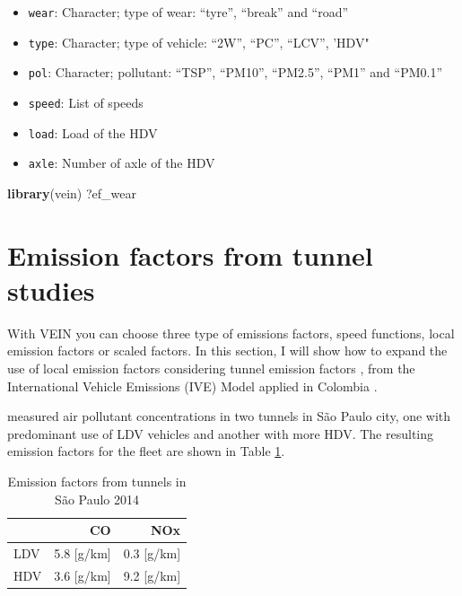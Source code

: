 \documentclass[12pt,graybox,envcountchap,sectrefs]{krantz}
\makeatletter
\newenvironment{Shaded}{\begin{snugshade}}{\end{snugshade}}
\newcommand{\KeywordTok}[1]{\textcolor[rgb]{0.13,0.29,0.53}{\textbf{#1}}}
\newcommand{\NormalTok}[1]{#1}
\providecommand{\tightlist}{%
  \setlength{\itemsep}{0pt}\setlength{\parskip}{0pt}}
\newenvironment{kframe}{%
\medskip{}
\setlength{\fboxsep}{.8em}
 \def\at@end@of@kframe{}%
 \ifinner\ifhmode%
  \def\at@end@of@kframe{\end{minipage}}%
  \begin{minipage}{\columnwidth}%
 \fi\fi%
 \def\FrameCommand##1{\hskip\@totalleftmargin \hskip-\fboxsep
 \colorbox{shadecolor}{##1}\hskip-\fboxsep
     \hskip-\linewidth \hskip-\@totalleftmargin \hskip\columnwidth}%
 \MakeFramed {\advance\hsize-\width
   \@totalleftmargin\z@ \linewidth\hsize
   \@setminipage}}%
 {\par\unskip\endMakeFramed%
 \at@end@of@kframe}
\renewenvironment{Shaded}{\begin{kframe}}{\end{kframe}}
\theoremstyle{definition}
\theoremstyle{definition}
\theoremstyle{definition}
\theoremstyle{remark}
\makeatother
\begin{document}
\begin{itemize}
\tightlist
\item
  \texttt{wear}: Character; type of wear: ``tyre'', ``break'' and
  ``road''
\item
  \texttt{type}: Character; type of vehicle: ``2W'', ``PC'', ``LCV'',
  'HDV"
\item
  \texttt{pol}: Character; pollutant: ``TSP'', ``PM10'', ``PM2.5'',
  ``PM1'' and ``PM0.1''
\item
  \texttt{speed}: List of speeds
\item
  \texttt{load}: Load of the HDV
\item
  \texttt{axle}: Number of axle of the HDV
\end{itemize}

\begin{Shaded}
\begin{Highlighting}[]
\KeywordTok{library}\NormalTok{(vein)}
\NormalTok{?ef_wear}
\end{Highlighting}
\end{Shaded}

\section{Emission factors from tunnel
studies}\label{emission-factors-from-tunnel-studies}

With VEIN you can choose three type of emissions factors, speed
functions, local emission factors or scaled factors. In this section, I
will show how to expand the use of local emission factors considering
tunnel emission factors \citep{perez2014emission}, from the
International Vehicle Emissions (IVE) Model \citep{Davisetal2005}
applied in Colombia \citep{gonzalez2017relative}.

\citet{perez2014emission} measured air pollutant concentrations in two
tunnels in São Paulo city, one with predominant use of LDV vehicles and
another with more HDV. The resulting emission factors for the fleet are
shown in Table \ref{tab:eftun}.

\begin{table}

\caption{\label{tab:eftun}Emission factors from tunnels in São Paulo 2014}
\centering
\begin{tabular}[t]{lrr}
\toprule
  & CO & NOx\\
\midrule
LDV & 5.8 [g/km] & 0.3 [g/km]\\
HDV & 3.6 [g/km] & 9.2 [g/km]\\
\bottomrule
\end{tabular}
\end{table}
\end{document}
